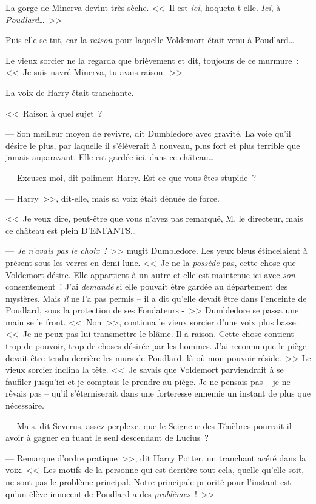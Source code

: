 La gorge de Minerva devint très sèche. <<~Il est \emph{ici}, hoqueta-t-elle. \emph{Ici}, à \emph{Poudlard}…~>>

Puis elle se tut, car la \emph{raison} pour laquelle Voldemort était venu à Poudlard…

Le vieux sorcier ne la regarda que brièvement et dit, toujours de ce murmure~: <<~Je suis navré Minerva, tu avais raison.~>>

La voix de Harry était tranchante.

<<~Raison à quel sujet~?

--- Son meilleur moyen de revivre, dit Dumbledore avec gravité. La voie qu'il désire le plus, par laquelle il s'élèverait à nouveau, plus fort et plus terrible que jamais auparavant. Elle est gardée ici, dans ce château…

--- Excusez-moi, dit poliment Harry. Est-ce que vous êtes stupide~?

--- Harry~>>, dit-elle, mais sa voix était dénuée de force.

<<~Je veux dire, peut-être que vous n'avez pas remarqué, M. le directeur, mais ce château est plein D'ENFANTS…

--- \emph{Je n'avais pas le choix~!}~>> mugit Dumbledore. Les yeux bleus étincelaient à présent sous les verres en demi-lune. <<~Je ne la \emph{possède} pas, cette chose que Voldemort désire. Elle appartient à un autre et elle est maintenue ici avec \emph{son} consentement~! J'ai \emph{demandé} si elle pouvait être gardée au département des mystères. Mais \emph{il} ne l'a pas permis -- il a dit qu'elle devait être dans l'enceinte de Poudlard, sous la protection de ses Fondateurs -~>> Dumbledore se passa une main se le front. <<~Non~>>, continua le vieux sorcier d'une voix plus basse. <<~Je ne peux pas lui transmettre le blâme. Il a raison. Cette chose contient trop de pouvoir, trop de choses désirée par les hommes. J'ai reconnu que le piège devait être tendu derrière les murs de Poudlard, là où mon pouvoir réside.~>> Le vieux sorcier inclina la tête. <<~Je savais que Voldemort parviendrait à se faufiler jusqu'ici et je comptais le prendre au piège. Je ne pensais pas -- je ne rêvais pas -- qu'il s'éterniserait dans une forteresse ennemie un instant de plus que nécessaire.

--- Mais, dit Severus, assez perplexe, que le Seigneur des Ténèbres pourrait-il avoir à gagner en tuant le seul descendant de Lucius~?

--- Remarque d'ordre pratique~>>, dit Harry Potter, un tranchant acéré dans la voix. <<~Les motifs de la personne qui est derrière tout cela, quelle qu'elle soit, ne sont pas le problème principal. Notre principale priorité pour l'instant est qu'un élève innocent de Poudlard a des \emph{problèmes}~!~>>

